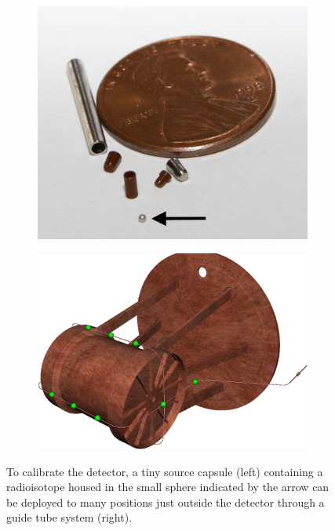 \documentclass[herrin-thesis.tex]{subfiles}
\begin{document}
\begin{figure}[htb]
\centering
\begin{subfigure}[c]{0.33\linewidth}
\includegraphics[width=\textwidth]{./photos/source_capsule_annotated.png}
\end{subfigure}\hspace{0.05\linewidth}\hfill%
\begin{subfigure}[c]{0.60\linewidth}
\includegraphics[width=\textwidth]{./photos/calibration_tubing_cropped.png}
\end{subfigure}
\caption[The calibration system]{To calibrate the detector, a tiny source capsule (left) containing a radioisotope housed in the small sphere indicated by the arrow can be deployed to many positions just outside the detector through a guide tube system (right).}
\label{fig:detector_calibration}
\end{figure}
\end{document}

